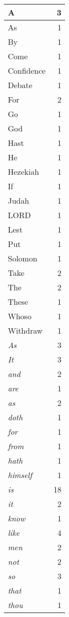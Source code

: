 \begin{center}
\begin{longtable}{l|r}
A & 3\\ \hline 
As & 1\\ \hline 
By & 1\\ \hline 
Come & 1\\ \hline 
Confidence & 1\\ \hline 
Debate & 1\\ \hline 
For & 2\\ \hline 
Go & 1\\ \hline 
God & 1\\ \hline 
Hast & 1\\ \hline 
He & 1\\ \hline 
Hezekiah & 1\\ \hline 
If & 1\\ \hline 
Judah & 1\\ \hline 
LORD & 1\\ \hline 
Lest & 1\\ \hline 
Put & 1\\ \hline 
Solomon & 1\\ \hline 
Take & 2\\ \hline 
The & 2\\ \hline 
These & 1\\ \hline 
Whoso & 1\\ \hline 
Withdraw & 1\\ \hline 
\emph{As} & 3\\ \hline 
\emph{It} & 3\\ \hline 
\emph{and} & 2\\ \hline 
\emph{are} & 1\\ \hline 
\emph{as} & 2\\ \hline 
\emph{doth} & 1\\ \hline 
\emph{for} & 1\\ \hline 
\emph{from} & 1\\ \hline 
\emph{hath} & 1\\ \hline 
\emph{himself} & 1\\ \hline 
\emph{is} & 18\\ \hline 
\emph{it} & 2\\ \hline 
\emph{know} & 1\\ \hline 
\emph{like} & 4\\ \hline 
\emph{men} & 2\\ \hline 
\emph{not} & 2\\ \hline 
\emph{so} & 3\\ \hline 
\emph{that} & 1\\ \hline 
\emph{thou} & 1\\ \hline 

\end{longtable}
\end{center}
